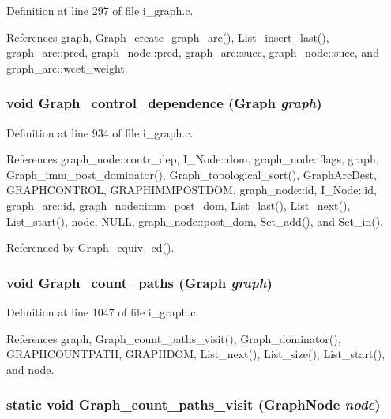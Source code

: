 Definition at line 297 of file i\_\-graph.c.

References graph, Graph\_\-create\_\-graph\_\-arc(), List\_\-insert\_\-last(), graph\_\-arc::pred, graph\_\-node::pred, graph\_\-arc::succ, graph\_\-node::succ, and graph\_\-arc::wcet\_\-weight.
\subsubsection{\setlength{\rightskip}{0pt plus 5cm}void Graph\_\-control\_\-dependence (\bf{Graph} {\em graph})}\label{i__graph_8c_da63051f5b0a209dae89861afba3a5f8}




Definition at line 934 of file i\_\-graph.c.

References graph\_\-node::contr\_\-dep, I\_\-Node::dom, graph\_\-node::flags, graph, Graph\_\-imm\_\-post\_\-dominator(), Graph\_\-topological\_\-sort(), Graph\-Arc\-Dest, GRAPHCONTROL, GRAPHIMMPOSTDOM, graph\_\-node::id, I\_\-Node::id, graph\_\-arc::id, graph\_\-node::imm\_\-post\_\-dom, List\_\-last(), List\_\-next(), List\_\-start(), node, NULL, graph\_\-node::post\_\-dom, Set\_\-add(), and Set\_\-in().

Referenced by Graph\_\-equiv\_\-cd().
\subsubsection{\setlength{\rightskip}{0pt plus 5cm}void Graph\_\-count\_\-paths (\bf{Graph} {\em graph})}\label{i__graph_8c_e1d55ff27eba3393de356891cc9f8561}




Definition at line 1047 of file i\_\-graph.c.

References graph, Graph\_\-count\_\-paths\_\-visit(), Graph\_\-dominator(), GRAPHCOUNTPATH, GRAPHDOM, List\_\-next(), List\_\-size(), List\_\-start(), and node.
\subsubsection{\setlength{\rightskip}{0pt plus 5cm}static void Graph\_\-count\_\-paths\_\-visit (\bf{Graph\-Node} {\em node})\hspace{0.3cm}{\tt  [static]}}\label{i__graph_8c_ac01c7f550002f8d7e71a566dd1195df}




